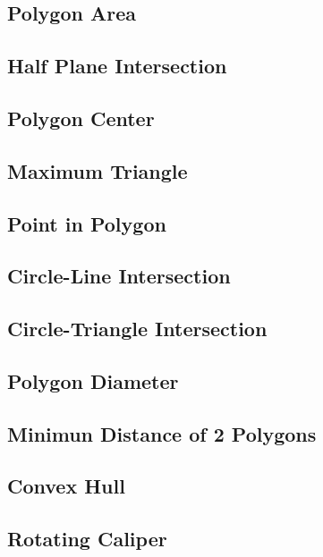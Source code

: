 \documentclass[a4paper,10pt,twocolumn,oneside]{article}
\begin{document}
\subsection{Polygon Area}

\subsection{Half Plane Intersection}

\subsection{Polygon Center}

\subsection{Maximum Triangle}

\subsection{Point in Polygon}

\subsection{Circle-Line Intersection}

\subsection{Circle-Triangle Intersection}

\subsection{Polygon Diameter}

\subsection{Minimun Distance of 2 Polygons}

\subsection{Convex Hull}

\subsection{Rotating Caliper}

\end{document}
